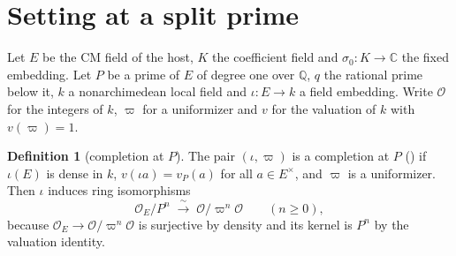 \documentclass[11pt]{article}
\newcommand{\OEr}{\mathcal O_E}
\newcommand{\Ok}{\mathcal O}
\theoremstyle{definition}
\newtheorem{definition}[theorem]{Definition}
\theoremstyle{remark}
\begin{document}
\section{Setting at a split prime}\label{sec:set}

Let $E$ be the CM field of the host, $K$ the coefficient field and $\sigma_0\colon K\to\mathbb C$ the fixed embedding. Let $P$ be a prime of $E$ of degree one over $\mathbb Q$, $q$ the rational prime below it, $k$ a nonarchimedean local field and $\iota\colon E\to k$ a field embedding. Write $\Ok$ for the integers of $k$, $\varpi$ for a uniformizer and $v$ for the valuation of $k$ with $v(\varpi)=1$.

\begin{definition}[completion at $P$]\label{def:compl}
The pair $(\iota,\varpi)$ is a completion at $P$ () if $\iota(E)$ is dense in $k$, $v(\iota a)=v_P(a)$ for all $a\in E^\times$, and $\varpi$ is a uniformizer. Then $\iota$ induces ring isomorphisms
\[
\OEr/P^{n}\;\xrightarrow{\ \sim\ }\;\Ok/\varpi^{n}\Ok\qquad(n\ge0),
\]
because $\OEr\to\Ok/\varpi^n\Ok$ is surjective by density and its kernel is $P^n$ by the valuation identity.
\end{definition}
\end{document}

